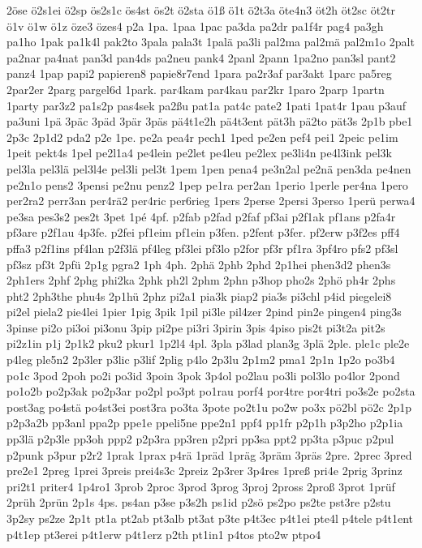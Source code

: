 {2öse
ö2s1ei
ö2sp
ös2s1c
ös4st
ös2t
ö2sta
ö1ß
ö1t
ö2t3a
öte4n3
öt2h
öt2sc
öt2tr
ö1v
ö1w
ö1z
öze3
özes4
p2a
1pa.
1paa
1pac
pa3da
pa2dr
pa1f4r
pag4
pa3gh
pa1ho
1pak
pa1k4l
pak2to
3pala
pala3t
1palä
pa3li
pal2ma
pal2mä
pal2m1o
2palt
pa2nar
pa4nat
pan3d
pan4ds
pa2neu
pank4
2panl
2pann
1pa2no
pan3sl
pant2
panz4
1pap
papi2
papieren8
papie8r7end
1para
pa2r3af
par3akt
1parc
pa5reg
2par2er
2parg
pargel6d
1park.
par4kam
par4kau
par2kr
1paro
2parp
1partn
1party
par3z2
pa1s2p
pas4sek
pa2ßu
pat1a
pat4c
pate2
1pati
1pat4r
1pau
p3auf
pa3uni
1pä
3päc
3päd
3pär
3päs
pä4t1e2h
pä4t3ent
pät3h
pä2to
pät3s
2p1b
pbe1
2p3c
2p1d2
pda2
p2e
1pe.
pe2a
pea4r
pech1
1ped
pe2en
pef4
pei1
2peic
pe1im
1peit
pekt4s
1pel
pe2l1a4
pe4lein
pe2let
pe4leu
pe2lex
pe3li4n
pe4l3ink
pel3k
pel3la
pel3lä
pel3l4e
pel3li
pel3t
1pem
1pen
pena4
pe3n2al
pe2nä
pen3da
pe4nen
pe2n1o
pens2
3pensi
pe2nu
penz2
1pep
pe1ra
per2an
1perio
1perle
per4na
1pero
per2ra2
perr3an
per4rä2
per4ric
per6rieg
1pers
2perse
2persi
3perso
1perü
perwa4
pe3sa
pes3s2
pes2t
3pet
1pé
4pf.
p2fab
p2fad
p2faf
pf3ai
p2f1ak
pf1ans
p2fa4r
pf3are
p2f1au
4p3fe.
p2fei
pf1eim
pf1ein
p3fen.
p2fent
p3fer.
pf2erw
p3f2es
pff4
pffa3
p2f1ins
pf4lan
p2f3lä
pf4leg
pf3lei
pf3lo
p2for
pf3r
pf1ra
3pf4ro
pfs2
pf3sl
pf3sz
pf3t
2pfü
2p1g
pgra2
1ph
4ph.
2phä
2phb
2phd
2p1hei
phen3d2
phen3s
2ph1ers
2phf
2phg
phi2ka
2phk
ph2l
2phm
2phn
p3hop
pho2s
2phö
ph4r
2phs
pht2
2ph3the
phu4s
2p1hü
2phz
pi2a1
pia3k
piap2
pia3s
pi3chl
p4id
piegelei8
pi2el
piela2
pie4lei
1pier
1pig
3pik
1pil
pi3le
pil4zer
2pind
pin2e
pingen4
ping3s
3pinse
pi2o
pi3oi
pi3onu
3pip
pi2pe
pi3ri
3pirin
3pis
4piso
pis2t
pi3t2a
pit2s
pi2z1in
p1j
2p1k2
pku2
pkur1
1p2l4
4pl.
3pla
p3lad
plan3g
3plä
2ple.
ple1c
ple2e
p4leg
ple5n2
2p3ler
p3lic
p3lif
2plig
p4lo
2p3lu
2p1m2
pma1
2p1n
1p2o
po3b4
po1c
3pod
2poh
po2i
po3id
3poin
3pok
3p4ol
po2lau
po3li
pol3lo
po4lor
2pond
po1o2b
po2p3ak
po2p3ar
po2pl
po3pt
po1rau
porf4
por4tre
por4tri
po3s2e
po2sta
post3ag
po4stä
po4st3ei
post3ra
po3ta
3pote
po2t1u
po2w
po3x
pö2bl
pö2c
2p1p
p2p3a2b
pp3anl
ppa2p
ppe1e
ppeli5ne
ppe2n1
ppf4
pp1fr
p2p1h
p3p2ho
p2p1ia
pp3lä
p2p3le
pp3oh
ppp2
p2p3ra
pp3ren
p2pri
pp3sa
ppt2
pp3ta
p3puc
p2pul
p2punk
p3pur
p2r2
1prak
1prax
p4rä
1präd
1präg
3präm
3präs
2pre.
2prec
3pred
pre2e1
2preg
1prei
3preis
prei4s3c
2preiz
2p3rer
3p4res
1preß
pri4e
2prig
3prinz
pri2t1
priter4
1p4ro1
3prob
2proc
3prod
3prog
3proj
2pross
2proß
3prot
1prüf
2prüh
2prün
2p1s
4ps.
ps4an
p3se
p3s2h
ps1id
p2sö
ps2po
ps2te
pst3re
p2stu
3p2sy
ps2ze
2p1t
pt1a
pt2ab
pt3alb
pt3at
p3te
p4t3ec
p4t1ei
pte4l
p4tele
p4t1ent
p4t1ep
pt3erei
p4t1erw
p4t1erz
p2th
pt1in1
p4tos
pto2w
ptpo4
}
